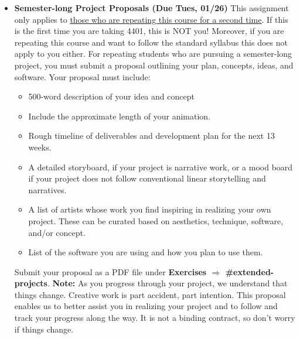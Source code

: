 \def\dMon{Mon, 01/25}
\def\dTues{Tues, 01/26}
\def\dWed{Wed, 01/27}
\def\dThur{Thur, 01/28}
\def\dFri{Fri, 01/29}
\def\dSat{Sat, 01/30}
\def\dSun{Sun, 01/31}
\placeDate

\begin{itemize}[noitemsep,topsep=0pt,leftmargin=*]
    \item \textbf{Semester-long Project Proposals (Due \dTues)} This assignment only applies to \ul{those who are repeating this course for a second time}. If this is the first time you are taking 4401, this is NOT you! Moreover, if you are repeating this course and want to follow the standard syllabus this does not apply to you either. For repeating students who are pursuing a semester-long project, you must submit a proposal outlining your plan, concepts, ideas, and software. Your proposal must include:
          \begin{itemize}
              \item 500-word description of your idea and concept
              \item Include the approximate length of your animation.
              \item Rough timeline of deliverables and development plan for the next 13 weeks.
              \item A detailed storyboard, if your project is narrative work, or a mood board if your project does not follow conventional linear storytelling and narratives.
              \item A list of artists whose work you find inspiring in realizing your own project. These can be curated based on aesthetics, technique, software, and/or concept.
              \item List of the software you are using and how you plan to use them.
          \end{itemize}
          Submit your proposal as a PDF file under \textbf{Exercises $\Rightarrow$ \#extended-projects}. \newline
          \small{\textbf{Note:} As you progress through your project, we understand that things change. Creative work is part accident, part intention. This proposal enables us to better assist you in realizing your project and to follow and track your progress along the way. It is not a binding contract, so don't worry if things change.}
\end{itemize}
\vspace{1em}
